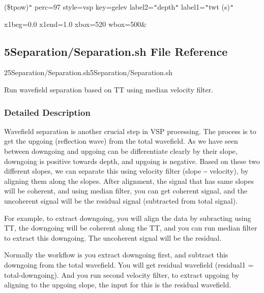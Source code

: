 \documentclass{article}
\begin{document}
\vspace{4pt}
(\$tpow)\texttt{"} perc=97 style=vsp key=gelev label2=\texttt{"}depth\texttt{"} 
label1=\texttt{"}twt (s)\texttt{"} 

\vspace{4pt}
x1beg=0.0 x1end=1.0 xbox=520 wbox=500\&\newpage

\newpage
\vspace{24pt}
\subsection*{{\large{}\textbf{5Separation/Separation.sh File Reference}}}

\vspace{12pt}
25Separation/Separation.sh5Separation/Separation.sh\label{AAAAAAAAAM}

\vspace{12pt}
Run wavefield separation based on TT using median velocity filter. 

\vspace{24pt}
\subsubsection*{\textbf{Detailed Description}}

\vspace{1pt}
Wavefield separation is another crucial step in VSP processing. The process is 
to get the upgoing (reflection wave) from the total wavefield. As we have seen 
between downgoing and upgoing can be differentiate clearly by their slope, downgoing 
is positive towards depth, and upgoing is negative. Based on these two different 
slopes, we can separate this using velocity filter (slope \textasciitilde{} velocity), 
by aligning them along the slopes. After alignment, the signal that has same slopes 
will be coherent, and using median filter, you can get coherent signal, and the 
uncoherent signal will be the residual signal (subtracted from total signal). 

\vspace{1pt}
For example, to extract downgoing, you will align the data by subracting using 
TT, the downgoing will be coherent along the TT, and you can run median filter 
to extract this downgoing. The uncoherent signal will be the residual. 

\vspace{1pt}
Normally the workflow is you extract downgoing first, and subtract this downgoing 
from the total wavefield. You will get residual wavefield (residual1 = total-downgoing). 
And you run second velocity filter, to extract upgoing by aligning to the upgoing 
slope, the input for this is the residual wavefield. 
\end{document}
